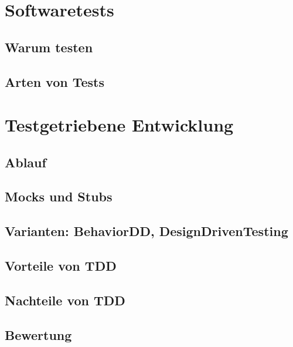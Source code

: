 \section{Softwaretests}

\subsection{Warum testen}

\subsection{Arten von Tests}

\section{Testgetriebene Entwicklung}
  \subsection{Ablauf}
  \subsection{Mocks und Stubs}
  \subsection{Varianten: BehaviorDD, DesignDrivenTesting}
  \subsection{Vorteile von TDD}
  \subsection{Nachteile von TDD}
  \subsection{Bewertung}